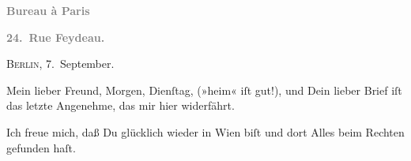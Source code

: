 \pstart
           \begin{otherlanguage}{french}\textcolor{gray}{\textbf{\textbf{Bureau à Paris}}}\end{otherlanguage}\pend
           
\pstart
           \begin{otherlanguage}{french}\textcolor{gray}{\textbf{\textbf{24. Rue Feydeau.}}}\end{otherlanguage}\hfill \textsc{Berlin}, 7. September.\pend
           
\pstart\center{}Mein lieber Freund,\pend\vspace{0.5em}
\pstart
           Morgen, Dienſtag, \label{K_L02784-1v}\label{K_L02784-1} (»heim« iſt gut!), und Dein lieber Brief iſt das letzte Angenehme,
               das mir hier widerfährt.\pend
           
\pstart
           Ich freue mich, daß Du glücklich wieder in Wien
               biſt und dort Alles beim Rechten gefunden haſt.\pend
           
